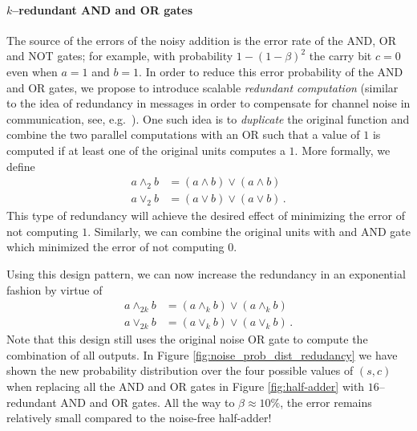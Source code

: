 \paragraph{$k$--redundant AND and OR gates} The source of the errors of the noisy addition is the error rate of the AND, OR and NOT gates; for example, with probability $1-(1-\beta)^2$ the carry bit $c=0$ even when $a=1$ and $b=1$. In order to reduce this error probability of the AND and OR gates, we propose to introduce scalable {\em redundant computation} (similar to the idea of redundancy in messages in order to compensate for channel noise in communication, see, e.g.\ \cite{Sha1948k}). One such idea is to {\em duplicate} the original function and combine the two parallel computations with an OR such that a value of $1$ is computed if at least one of the original units computes a $1$. More formally, we define
\begin{align}
    a \land_2 b & = (a \land b) \lor (a \land b) \\
    a \lor_2 b & = (a \lor b) \lor (a \lor b) \,.
\end{align}
This type of redundancy will achieve the desired effect of minimizing the error of not computing $1$. Similarly, we can combine the original units with and AND gate which minimized the error of not computing $0$. 

Using this design pattern, we can now increase the redundancy in an exponential fashion by virtue of 
\begin{align}
    a \land_{2k} b & = (a \land_k b) \lor (a \land_k b) \\
    a \lor_{2k} b & = (a \lor_k b) \lor (a \lor_k b) \,.
\end{align}
Note that this design still uses the original noise OR gate to compute the combination of all outputs. In Figure \ref{fig:noise_prob_dist_redudancy} we have shown the new probability distribution over the four possible values of $(s,c)$ when replacing all the AND and OR gates in Figure \ref{fig:half-adder} with $16$--redundant AND and OR gates. All the way to $\beta \approx 10\%$, the error remains relatively small compared to the noise-free half-adder!

